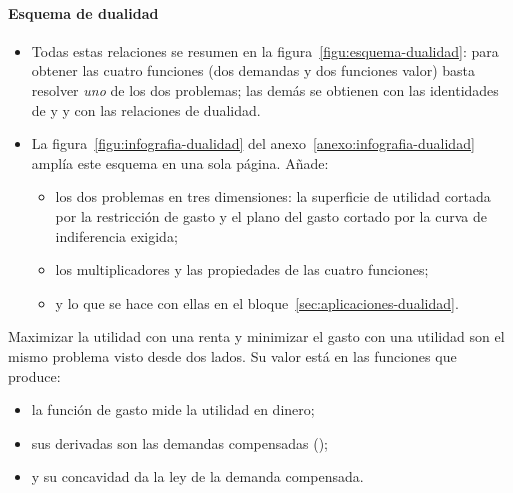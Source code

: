 \documentclass[11pt]{article}
\begin{document}
\paragraph{Esquema de dualidad}

\begin{itemize}
\item Todas estas relaciones se resumen en la figura~\ref{figu:esquema-dualidad}: para obtener las cuatro funciones (dos demandas y dos funciones valor) basta resolver \emph{uno} de los dos problemas; las demás se obtienen con las identidades de  y  y con las relaciones de dualidad.
\item La figura~\ref{figu:infografia-dualidad} del anexo~\ref{anexo:infografia-dualidad} amplía este esquema en una sola página. Añade:
  \begin{itemize}
  \item los dos problemas en tres dimensiones: la superficie de utilidad cortada por la restricción de gasto y el plano del gasto cortado por la curva de indiferencia exigida;
  \item los multiplicadores y las propiedades de las cuatro funciones;
  \item y lo que se hace con ellas en el bloque~\ref{sec:aplicaciones-dualidad}.
  \end{itemize}
\end{itemize}

\begin{infografia}[H]
\centering
\caption{Esquema de dualidad: problemas, soluciones, funciones valor y relaciones entre ellas}\label{figu:esquema-dualidad}
\end{infografia}

\begin{ideaclave}
Maximizar la utilidad con una renta y minimizar el gasto con una utilidad son el mismo problema visto desde dos lados. Su valor está en las funciones que produce:
\begin{itemize}
\item la función de gasto mide la utilidad en dinero;
\item sus derivadas son las demandas compensadas ();
\item y su concavidad da la ley de la demanda compensada.
\end{itemize}
\end{ideaclave}
\end{document}
